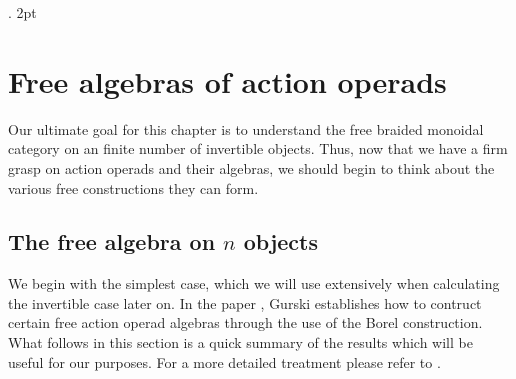 \documentclass{amsart} %
\begin{document}
\newtheorem{thm}[equation]{Theorem}
\newtheorem{prop}[equation]{Proposition}
\newtheorem{lem}[equation]{Lemma}
\newtheorem{cor}[equation]{Corollary}

%
     {}%
     {}%
     {\bfseries}%
     {.}%
     {2pt}%
     {}%

   \theoremstyle{example}
   \newtheorem{nota}[equation]{Notation}
   \newtheorem{example}[equation]{Example}
   \newtheorem{defi}[equation]{Definition}
   \newtheorem{rem}[equation]{Remark}
	\newtheorem{comment}[equation]{Comment}

\tableofcontents

\section{Free algebras of action operads}

Our ultimate goal for this chapter is to understand the free braided monoidal category on an finite number of invertible objects. Thus, now that we have a firm grasp on action operads and their algebras, we should begin to think about the various free constructions they can form. 

\subsection{The free algebra on $n$ objects} 

We begin with the simplest case, which we will use extensively when calculating the invertible case later on. In the paper \cite{operadborel}, Gurski establishes how to contruct certain free action operad algebras through the use of the Borel construction. What follows in this section is a quick summary of the results which will be useful for our purposes. For a more detailed treatment please refer to \cite{operadborel}.
\end{document}

